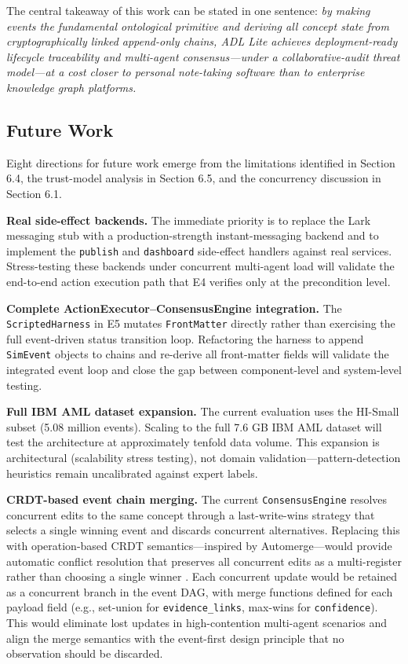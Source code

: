 The central takeaway of this work can be stated in one sentence: \emph{by making events the fundamental ontological primitive and deriving all concept state from cryptographically linked append-only chains, ADL Lite achieves deployment-ready lifecycle traceability and multi-agent consensus---under a collaborative-audit threat model---at a cost closer to personal note-taking software than to enterprise knowledge graph platforms.}

\subsection{Future Work}\label{future-work}

Eight directions for future work emerge from the limitations identified in Section 6.4, the trust-model analysis in Section 6.5, and the concurrency discussion in Section 6.1.

\textbf{Real side-effect backends.} The immediate priority is to replace the Lark messaging stub with a production-strength instant-messaging backend and to implement the \texttt{publish} and \texttt{dashboard} side-effect handlers against real services. Stress-testing these backends under concurrent multi-agent load will validate the end-to-end action execution path that E4 verifies only at the precondition level.

\textbf{Complete ActionExecutor--ConsensusEngine integration.} The \texttt{ScriptedHarness} in E5 mutates \texttt{FrontMatter} directly rather than exercising the full event-driven status transition loop. Refactoring the harness to append \texttt{SimEvent} objects to chains and re-derive all front-matter fields will validate the integrated event loop and close the gap between component-level and system-level testing.

\textbf{Full IBM AML dataset expansion.} The current evaluation uses the HI-Small subset (5.08 million events). Scaling to the full 7.6 GB IBM AML dataset will test the architecture at approximately tenfold data volume. This expansion is architectural (scalability stress testing), not domain validation---pattern-detection heuristics remain uncalibrated against expert labels.

\textbf{CRDT-based event chain merging.} The current \texttt{ConsensusEngine} resolves concurrent edits to the same concept through a last-write-wins strategy that selects a single winning event and discards concurrent alternatives. Replacing this with operation-based CRDT semantics---inspired by Automerge---would provide automatic conflict resolution that preserves all concurrent edits as a multi-register rather than choosing a single winner \cite{ref21}. Each concurrent update would be retained as a concurrent branch in the event DAG, with merge functions defined for each payload field (e.g., set-union for \texttt{evidence\_links}, max-wins for \texttt{confidence}). This would eliminate lost updates in high-contention multi-agent scenarios and align the merge semantics with the event-first design principle that no observation should be discarded.

